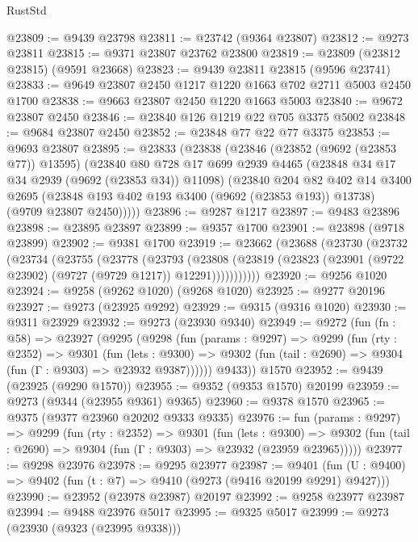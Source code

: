 \begin{lexlean}{RustStd}
\begin{coremodule}
@23809 := @9439 @23798
@23811 := @23742 (@9364 @23807)
@23812 := @9273 @23811
@23815 := @9371 @23807 @23762 @23800
@23819 := @23809 (@23812 @23815) (@9591 @23668)
@23823 := @9439 @23811 @23815 (@9596 @23741)
@23833 := @9649 @23807 @2450 @1217 @1220 @1663 @702 @2711 @5003 @2450 @1700
@23838 := @9663 @23807 @2450 @1220 @1663 @5003
@23840 := @9672 @23807 @2450
@23846 := @23840 @126 @1219 @22 @705 @3375 @5002
@23848 := @9684 @23807 @2450
@23852 := @23848 @77 @22 @77 @3375
@23853 := @9693 @23807
@23895 := @23833
    (@23838
      (@23846
        (@23852 (@9692 (@23853 @77)) @13595)
        (@23840
          @80
          @728
          @17
          @699
          @2939
          @4465
          (@23848 @34 @17 @34 @2939 (@9692 (@23853 @34)) @11098)
          (@23840
            @204
            @82
            @402
            @14
            @3400
            @2695
            (@23848 @193 @402 @193 @3400 (@9692 (@23853 @193)) @13738)
            (@9709 @23807 @2450)))))
@23896 := @9287 @1217
@23897 := @9483 @23896
@23898 := @23895 @23897
@23899 := @9357 @1700
@23901 := @23898 (@9718 @23899)
@23902 := @9381 @1700
@23919 := @23662
    (@23688
      (@23730
        (@23732
          (@23734
            (@23755
              (@23778
                (@23793
                  (@23808
                    (@23819 (@23823 (@23901 (@9722 @23902) (@9727 (@9729 @1217)) @12291)))))))))))
@23920 := @9256 @1020
@23924 := @9258 (@9262 @1020) (@9268 @1020)
@23925 := @9277 @20196
@23927 := @9273 (@23925 @9292)
@23929 := @9315 (@9316 @1020)
@23930 := @9311 @23929
@23932 := @9273 (@23930 @9340)
@23949 := @9272
    (fun (fn : @58) =>
    @23927
      (@9295
        (@9298
          (fun (params : @9297) =>
          @9299
            (fun (rty : @2352) =>
            @9301
              (fun (lets : @9300) =>
              @9302 (fun (tail : @2690) => @9304 (fun (Γ : @9303) => @23932 @9387))))))
        @9433))
    @1570
@23952 := @9439 (@23925 (@9290 @1570))
@23955 := @9352 (@9353 @1570) @20199
@23959 := @9273 (@9344 (@23955 @9361) @9365)
@23960 := @9378 @1570
@23965 := @9375 (@9377 @23960 @20202 @9333 @9335)
@23976 := fun (params : @9297) =>
  @9299
    (fun (rty : @2352) =>
    @9301
      (fun (lets : @9300) =>
      @9302 (fun (tail : @2690) => @9304 (fun (Γ : @9303) => @23932 (@23959 @23965)))))
@23977 := @9298 @23976
@23978 := @9295 @23977
@23987 := @9401
    (fun (U : @9400) => @9402 (fun (t : @7) => @9410 (@9273 (@9416 @20199 @9291) @9427)))
@23990 := @23952 (@23978 @23987) @20197
@23992 := @9258 @23977 @23987
@23994 := @9488 @23976 @5017
@23995 := @9325 @5017
@23999 := @9273 (@23930 (@9323 (@23995 @9338)))

\end{coremodule}
\end{lexlean}
